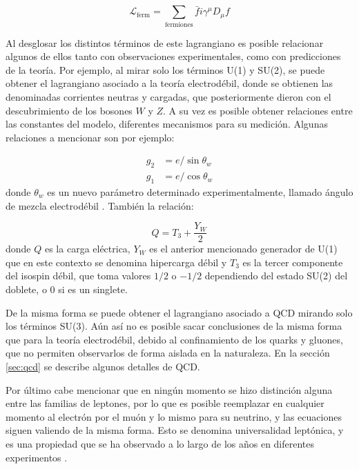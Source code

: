 \begin{equation}
\mathcal{L}_{\text{ferm}} = \sum_{\text{fermiones}} \bar{f}i\gamma^{\mu}D_{\mu}f
\end{equation}

Al desglosar los distintos términos de este lagrangiano es posible relacionar algunos de ellos tanto con observaciones experimentales, como con predicciones de la teoría. Por ejemplo, al mirar solo los términos U(1) y SU(2), se puede obtener el lagrangiano asociado a la teoría electrodébil, donde se obtienen las denominadas corrientes neutras y cargadas, que posteriormente dieron con el descubrimiento de los bosones $W$ y $Z$. A su vez es posible obtener relaciones entre las constantes del modelo, diferentes mecanismos para su medición. Algunas relaciones a mencionar son por ejemplo:

\begin{equation}
\begin{split}
g_2 & = e/\sin{\theta_w} \\
g_1 & = e/\cos{\theta_w}
\end{split}
\end{equation}
%
donde $\theta_w$ es un nuevo parámetro determinado experimentalmente, llamado ángulo de mezcla electrodébil . También la relación:

\begin{equation}
Q = T_3 + \frac{Y_W}{2} 
\end{equation}
%
donde $Q$ es la carga eléctrica, $Y_W$ es el anterior mencionado generador de U(1) que en este contexto se denomina hipercarga débil y $T_3$ es la tercer componente del isospin débil, que toma valores $1/2$ o $-1/2$ dependiendo del estado SU(2) del doblete, o $0$ si es un singlete.

De la misma forma se puede obtener el lagrangiano asociado a QCD mirando solo los términos SU(3). Aún así no es posible sacar conclusiones de la misma forma que para la teoría electrodébil, debido al confinamiento de los quarks y gluones, que no permiten observarlos de forma aislada en la naturaleza. En la sección \ref{sec:qcd} se describe algunos detalles de QCD.

Por último cabe mencionar que en ningún momento se hizo distinción alguna entre las familias de leptones, por lo que es posible reemplazar en cualquier momento al electrón por el muón y lo mismo para su neutrino, y las ecuaciones siguen valiendo de la misma forma. Esto se denomina universalidad leptónica, y es una propiedad que se ha observado a lo largo de los años en diferentes experimentos .


